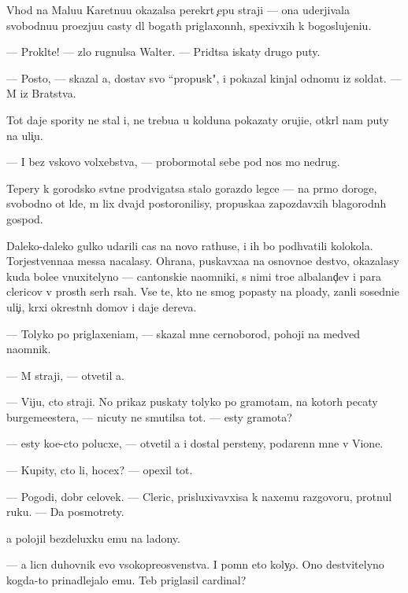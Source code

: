 \documentclass[10pt]{book}
\begin{document}
V{\yi}hod na Malu{\y}u Karetnu{\y}u okazalsa perekr{\yi}t {\c}ep{\y}u straji — ona uderjivala svobodnu{\y}u pro{\y}ezju{\y}u casty dl{\ia} bogat{\yi}h priglaxonn{\yi}h, spexivxih k bogoslujeni{\y}u.

— Prokl{\ia}t{\y}e! — zlo rugnulsa Walter. — Prid{\e}tsa iskaty drugo{\y} puty.

— Posto{\y}, — skazal {\y}a, dostav svo{\y} ``propusk", i pokazal kinjal odnomu iz soldat. — M{\yi} iz Bratstva.

Tot daje spority ne stal i, ne trebu{\y}a u kolduna pokazaty oruji{\y}e, otkr{\yi}l nam puty na uli{\c}u.

— I bez vs{\ia}kovo volxebstva, — probormotal sebe pod nos mo{\y} nedrug.

Tepery k gorodsko{\y} sv{\ia}t{\yi}ne prodvigatsa stalo gorazdo legce — na pr{\ia}mo{\y} doroge, svobodno{\y} ot l{\io}de{\y}, m{\yi} lix dvajd{\yi} postoronilisy, propuska{\y}a zapozdavxih blagorodn{\yi}h gospod.

Daleko-daleko gulko udarili cas{\yi} na novo{\y} rathuse, i ih bo{\y} podhvatili kolokola. Torjestvenna{\y}a messa nacalasy. Ohrana, puskavxa{\y}a na osnovno{\y}e de{\y}stvo, okazalasy kuda bole{\y}e vnuxitelyno{\y} — cantonski{\y}e na{\y}omniki, s nimi tro{\y}e albaland{\c}ev i para clericov v prost{\yi}h ser{\yi}h r{\ia}sah. Vse te, kto ne smog popasty na plo{\x}ady, zan{\ia}li sosedni{\y}e uli{\c}i, kr{\yi}xi okrestn{\yi}h domov i daje derev{\y}a.

— Tolyko po priglaxeni{\y}am, — skazal mne cernoborod{\yi}{\y}, pohoji{\y} na medved{\ia} na{\y}omnik.

— M{\yi} straji, — otvetil {\y}a.

— Viju, cto straji. No prikaz puskaty tolyko po gramotam, na kotor{\yi}h pecaty burgemeestera, — nicuty ne smutilsa tot. — {\Y}esty gramota?

— {\Y}esty ko{\y}e-cto polucxe, — otvetil {\y}a i dostal persteny, podarenn{\yi}{\y} mne v Vione.

— Kupity, cto li, hocex? — opexil tot.

— Pogodi, dobr{\yi}{\y} celovek. — Cleric, prisluxivavxi{\y}sa k naxemu razgovoru, prot{\ia}nul ruku. — Da{\y} posmotrety.

{\Y}a polojil bezdeluxku {\y}emu na ladony.

— {\Y}a licn{\yi}{\y} duhovnik {\y}evo v{\yi}sokopreosv{\ia}{\x}enstva. I pomn{\io} eto koly{\c}o. Ono de{\y}stvitelyno kogda-to prinadlejalo {\y}emu. Teb{\ia} priglasil cardinal?
\end{document}
